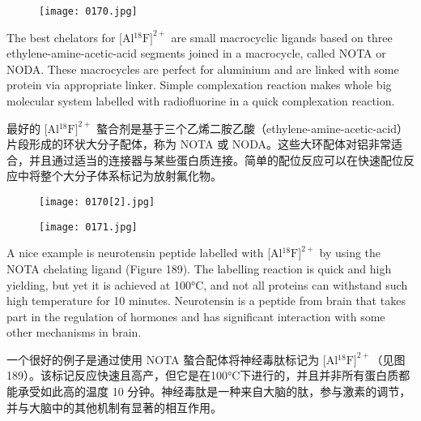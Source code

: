 \documentclass[dvipsnames, svgnames,a4paper,11pt]{article}
\begin{document}
\begin{figure}[h]
	\centering
    \texttt{[image: 0170.jpg]}   
     \label{fig187}
\end{figure}

The best chelators for [Al${}^\mathrm{18}\mathrm{F}]^{2+}$ are small macrocyclic ligands based on three
ethylene-amine-acetic-acid segments joined in a macrocycle, called NOTA or NODA.
These macrocycles are perfect for aluminium and are linked with some protein via
appropriate linker. Simple complexation reaction makes whole big molecular system
labelled with radiofluorine in a quick complexation reaction.

最好的 [Al${}^\mathrm{18}\mathrm{F}]^{2+}$ 螯合剂是基于三个乙烯二胺乙酸（ethylene-amine-acetic-acid）片段形成的环状大分子配体，称为 NOTA 或 NODA。这些大环配体对铝非常适合，并且通过适当的连接器与某些蛋白质连接。简单的配位反应可以在快速配位反应中将整个大分子体系标记为放射氟化物。

\begin{figure}[h]
	\centering
    \texttt{[image: 0170[2].jpg]}   
     \label{fig188}
\end{figure}

\begin{figure}[h]
	\centering
    \texttt{[image: 0171.jpg]}   
     \label{fig189}
\end{figure}

A nice example is neurotensin peptide labelled with [Al${}^\mathrm{18}\mathrm{F}]^{2+}$ by using the NOTA
chelating ligand (Figure 189). The labelling reaction is quick and high yielding, but
yet it is achieved at 100°C, and not all proteins can withstand such high temperature
for 10 minutes. Neurotensin is a peptide from brain that takes part in the regulation of
hormones and has significant interaction with some other mechanisms in brain. 

一个很好的例子是通过使用 NOTA 螯合配体将神经毒肽标记为 [Al${}^\mathrm{18}\mathrm{F}]^{2+}$（见图 189）。该标记反应快速且高产，但它是在100°C下进行的，并且并非所有蛋白质都能承受如此高的温度 10 分钟。神经毒肽是一种来自大脑的肽，参与激素的调节，并与大脑中的其他机制有显著的相互作用。
\end{document}

